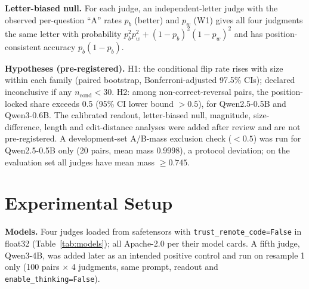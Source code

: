 \documentclass[conference]{IEEEtran}
\begin{document}
\textbf{Letter-biased null.} For each judge, an independent-letter judge with the observed per-question
``A'' rates $p_b$ (better) and $p_w$ (W1) gives all four judgments the same letter with probability
$p_b^2p_w^2+(1-p_b)^2(1-p_w)^2$ and has position-consistent accuracy $p_b(1-p_b)$.

\textbf{Hypotheses (pre-registered).} H1: the conditional flip rate rises with size within each family (paired
bootstrap, Bonferroni-adjusted 97.5\% CIs); declared inconclusive if any $n_\mathrm{cond}<30$. H2: among
non-correct-reversal pairs, the position-locked share exceeds 0.5 (95\% CI lower bound $>0.5$), for Qwen2.5-0.5B
and Qwen3-0.6B. The calibrated readout, letter-biased null, magnitude, size-difference, length and
edit-distance analyses were added after review and are not pre-registered. A development-set A/B-mass exclusion check ($<0.5$) was run for Qwen2.5-0.5B only (20 pairs, mean
mass 0.9998), a protocol deviation; on the evaluation set all judges have mean mass $\ge 0.745$.

\section{Experimental Setup}\label{sec:setup}
\textbf{Models.} Four judges loaded from safetensors with \texttt{trust\_remote\_code=False} in float32
(Table~\ref{tab:models}); all Apache-2.0 per their model cards. A fifth judge, Qwen3-4B, was added later as an
intended positive control and run on resample 1 only (100 pairs $\times$ 4 judgments, same prompt, readout and
\texttt{enable\_thinking=False}).

\begin{table}[t]
\centering
\caption{Judges and data with pinned revisions (first 12 hex digits; full SHAs in \texttt{results/models.md}).}
\label{tab:models}
\end{table}
\end{document}
